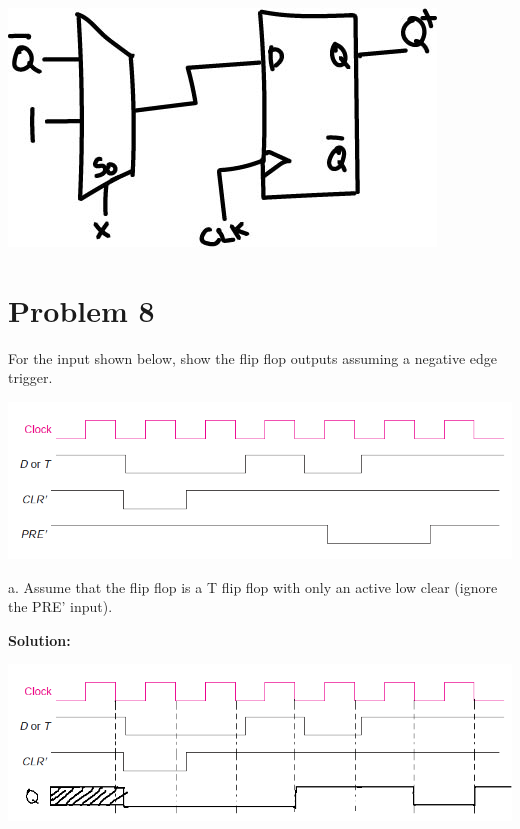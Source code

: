 \documentclass{article}
\begin{document}
    \begin{center}
        \includegraphics[scale=0.5]{HW4_q7.jpg}
    \end{center}


    \section*{Problem 8}

    For the input shown below, show the flip flop outputs assuming a negative edge trigger.

    \begin{center}
        \includegraphics[width=\linewidth]{HW4_q8.png}
    \end{center}

    a. Assume that the flip flop is a T flip flop with only an active low clear (ignore the 
    PRE’ input).

    \textbf{Solution:}

    \begin{center}
        \includegraphics[width=\linewidth]{HW4_q8.1.png}
    \end{center}
\end{document}
